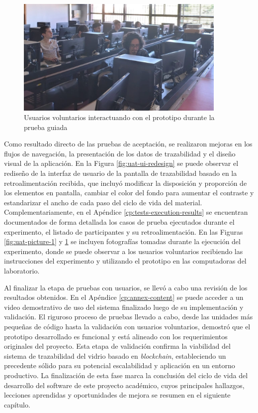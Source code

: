 \begin{figure}[!tb]
\centering
\includegraphics[width=0.9\textwidth]{Figures/uat-2.jpg}
\caption{Usuarios voluntarios interactuando con el prototipo durante la prueba guiada}
\label{fig:uat-picture-2}
\end{figure}

Como resultado directo de las pruebas de aceptación, se realizaron mejoras en los flujos de navegación, la presentación de los datos de \gls{trazabilidad} y el diseño visual de la aplicación. En la Figura \ref{fig:uat-ui-redesign} se puede observar el rediseño de la interfaz de usuario de la pantalla de trazabilidad basado en la retroalimentación recibida, que incluyó modificar la disposición y proporción de los elementos en pantalla, cambiar el color del fondo para aumentar el contraste y estandarizar el ancho de cada paso del ciclo de vida del material. Complementariamente, en el Apéndice \ref{cp:tests-execution-results} se encuentran documentados de forma detallada los casos de prueba ejecutados durante el experimento, el listado de participantes y su retroalimentación. En las Figuras \ref{fig:uat-picture-1} y \ref{fig:uat-picture-2} se incluyen fotografías tomadas durante la ejecución del experimento, donde se puede observar a los usuarios voluntarios recibiendo las instrucciones del experimento y utilizando el prototipo en las computadoras del laboratorio.

Al finalizar la etapa de pruebas con usuarios, se llevó a cabo una revisión de los resultados obtenidos. En el Apéndice \ref{cp:annex-content} se puede acceder a un video demostrativo de uso del sistema finalizado luego de su implementación y validación. El riguroso proceso de pruebas llevado a cabo, desde las unidades más pequeñas de código hasta la validación con usuarios voluntarios, demostró que el prototipo desarrollado es funcional y está alineado con los requerimientos originales del proyecto. Esta etapa de validación confirma la viabilidad del sistema de trazabilidad del vidrio basado en \textit{blockchain}, estableciendo un precedente sólido para su potencial escalabilidad y aplicación en un entorno productivo. La finalización de esta fase marca la conclusión del ciclo de vida del desarrollo del software de este proyecto académico, cuyos principales hallazgos, lecciones aprendidas y oportunidades de mejora se resumen en el siguiente capítulo.
